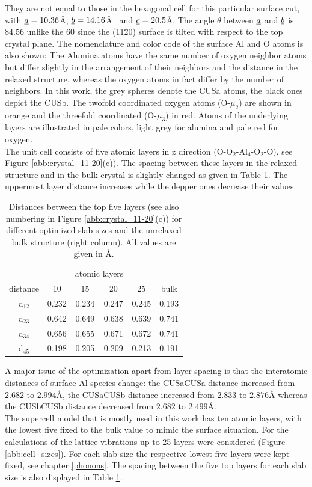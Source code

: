 \documentclass[11pt,DIV=13,BCOR=5mm,a4paper,headinclude]{scrbook}
\begin{document}
They are not equal to those in the hexagonal cell for this particular surface cut, with $\uline{a}=10.36$\AA, $\uline{b}=14.16$\AA~ and $\uline{c}=20.5$\AA.
The angle $\theta$ between $\uline{a}$ and $\uline{b}$ is $84.56$\textdegree{} unlike the $60$\textdegree{} since the (11\=20) surface is tilted with respect to the top crystal plane.
The nomenclature and color code of the surface Al and O atoms is also shown: The Alumina atoms have the same number of oxygen neighbor atoms but differ slightly in the arrangement of their neighbors and the distance in the relaxed structure, whereas the oxygen atoms in fact differ by the number of neighbors.
In this work, the grey spheres denote the CUSa atoms, the black ones depict the CUSb.
The twofold coordinated oxygen atoms (O-$\mu_2$) are shown in orange and the threefold coordinated (O-$\mu_3$) in red.
Atoms of the underlying layers are illustrated in pale colors, light grey for alumina and pale red for oxygen.
\\
The unit cell consists of five atomic layers in z direction (O-O$_2$-Al$_4$-O$_2$-O), see Figure \ref{abb:crystal_11-20}(c)).
The spacing between these layers in the relaxed structure and in the bulk crystal is slightly changed as given in Table \ref{tab:layer-dist}.
The uppermost layer distance increases while the depper ones decrease their values.
\begin{table}[!ht]
  \centering
 \caption{Distances between the top five layers (see also numbering in Figure \ref{abb:crystal_11-20}(c)) for different optimized slab sizes and the unrelaxed bulk structure (right column).
All values are given in \AA.} 
\vspace*{.2cm}
\begin{tabular}{c|cccc|c}
\toprule
 & &\multicolumn{2}{c}{atomic layers}&&\\
    distance    & 10   & 15   & 20   & 25   &bulk \\\midrule
 d$_{12}$	&0.232 &0.234 &0.247 &0.245 &0.193 \\
 d$_{23}$	&0.642 &0.649 &0.638 &0.639 &0.741 \\
 d$_{34}$	&0.656 &0.655 &0.671 &0.672 &0.741 \\
 d$_{45}$	&0.198 &0.205 &0.209 &0.213 &0.191 \\\bottomrule
  \end{tabular}
  \label{tab:layer-dist}
\end{table}
A major issue of the optimization apart from layer spacing is that the interatomic distances of surface Al species change: the CUSa\textendash CUSa distance increased from $2.682$ to $2.994$\AA{}, the CUSa\textendash CUSb distance increased from $2.833$ to $2.876$\AA{} whereas the CUSb\textendash CUSb distance decreased from $2.682$ to $2.499$\AA{}.
\\
The supercell model that is mostly used in this work has ten atomic layers, with the lowest five fixed to the bulk value to mimic the surface situation.
For the calculations of the lattice vibrations up to 25 layers were considered (Figure \ref{abb:cell_sizes}).
For each slab size the respective lowest five layers were kept fixed, see chapter \ref{phonons}.
The spacing between the five top layers for each slab size is also displayed in Table \ref{tab:layer-dist}.
\end{document}
